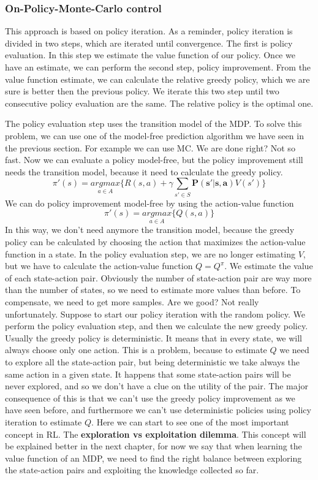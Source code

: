 \documentclass[main.tex]{subfiles}
\begin{document}
\subsubsection{On-Policy-Monte-Carlo control}
This approach is based on policy iteration. As a reminder, policy iteration is divided in two steps, which are iterated until convergence. The first is policy evaluation. In this step we estimate the value function of our policy. Once we have an estimate, we can perform the second step, policy improvement. From the value function estimate, we can calculate the relative greedy policy, which we are sure is better then the previous policy. We iterate this two step until two consecutive policy evaluation are the same. The relative policy is the optimal one.
\par
\noindent
The policy evaluation step uses the transition model of the MDP. To solve this problem, we can use one of the model-free prediction algorithm we have seen in the previous section. For example we can use MC. We are done right? Not so fast. Now we can evaluate a policy model-free, but the policy improvement still needs the transition model, because it need to calculate the greedy policy.
\begin{equation*}
    \pi'(s) = \underset{a \in A}{argmax} \bigg\{ R(s,a) + \gamma \sum_{s' \in S} \mathbf{P(s'|s,a)} V(s') \bigg\}
\end{equation*}
We can do policy improvement model-free by using the action-value function
\begin{equation}
    \pi'(s) = \underset{a \in A}{argmax} \bigg\{ Q(s,a) \bigg\}
\end{equation}
In this way, we don't need anymore the transition model, because the greedy policy can be calculated by choosing the action that maximizes the action-value function in a state. In the policy evaluation step, we are no longer estimating $V$, but we have to calculate the action-value function $Q = Q^{\pi}$. We estimate the value of each state-action pair. Obviously the number of state-action pair are way more than the number of states, so we need to estimate more values than before. To compensate, we need to get more samples. Are we good? Not really unfortunately. Suppose to start our policy iteration with the random policy. We perform the policy evaluation step, and then we calculate the new greedy policy. Usually the greedy policy is deterministic. It means that in every state, we will always choose only one action. This is a problem, because to estimate $Q$ we need to explore all the state-action pair, but being deterministic we take always the same action in a given state. It happens that some state-action pairs will be never explored, and so we don't have a clue on the utility of the pair. The major consequence of this is that we can't use the greedy policy improvement as we have seen before, and furthermore we can't use deterministic policies using policy iteration to estimate $Q$. Here we can start to see one of the most important concept in RL. The \textbf{exploration vs exploitation dilemma}. This concept will be explained better in the next chapter, for now we say that when learning the value function of an MDP, we need to find the right balance between exploring the state-action pairs and exploiting the knowledge collected so far.
\end{document}
